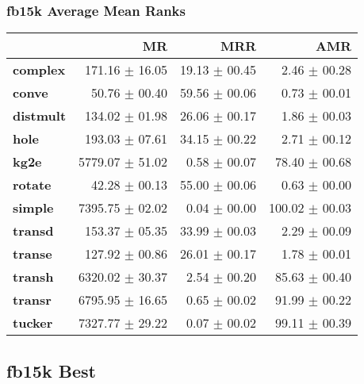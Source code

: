 \documentclass{article}
\begin{document}
\subsubsection{fb15k Average Mean Ranks}
    \begin{center}
    \begin{tabular}{lrrr}
\toprule
{} &               MR &            MRR &             AMR \\
\midrule
\textbf{complex } &   171.16 $\pm$ 16.05 &  19.13 $\pm$ 00.45 &    2.46 $\pm$ 00.28 \\
\textbf{conve   } &    50.76 $\pm$ 00.40 &  59.56 $\pm$ 00.06 &    0.73 $\pm$ 00.01 \\
\textbf{distmult} &   134.02 $\pm$ 01.98 &  26.06 $\pm$ 00.17 &    1.86 $\pm$ 00.03 \\
\textbf{hole    } &   193.03 $\pm$ 07.61 &  34.15 $\pm$ 00.22 &    2.71 $\pm$ 00.12 \\
\textbf{kg2e    } &  5779.07 $\pm$ 51.02 &   0.58 $\pm$ 00.07 &   78.40 $\pm$ 00.68 \\
\textbf{rotate  } &    42.28 $\pm$ 00.13 &  55.00 $\pm$ 00.06 &    0.63 $\pm$ 00.00 \\
\textbf{simple  } &  7395.75 $\pm$ 02.02 &   0.04 $\pm$ 00.00 &  100.02 $\pm$ 00.03 \\
\textbf{transd  } &   153.37 $\pm$ 05.35 &  33.99 $\pm$ 00.03 &    2.29 $\pm$ 00.09 \\
\textbf{transe  } &   127.92 $\pm$ 00.86 &  26.01 $\pm$ 00.17 &    1.78 $\pm$ 00.01 \\
\textbf{transh  } &  6320.02 $\pm$ 30.37 &   2.54 $\pm$ 00.20 &   85.63 $\pm$ 00.40 \\
\textbf{transr  } &  6795.95 $\pm$ 16.65 &   0.65 $\pm$ 00.02 &   91.99 $\pm$ 00.22 \\
\textbf{tucker  } &  7327.77 $\pm$ 29.22 &   0.07 $\pm$ 00.02 &   99.11 $\pm$ 00.39 \\
\bottomrule
\end{tabular}

    \end{center}
\subsection{fb15k Best}
\end{document}
